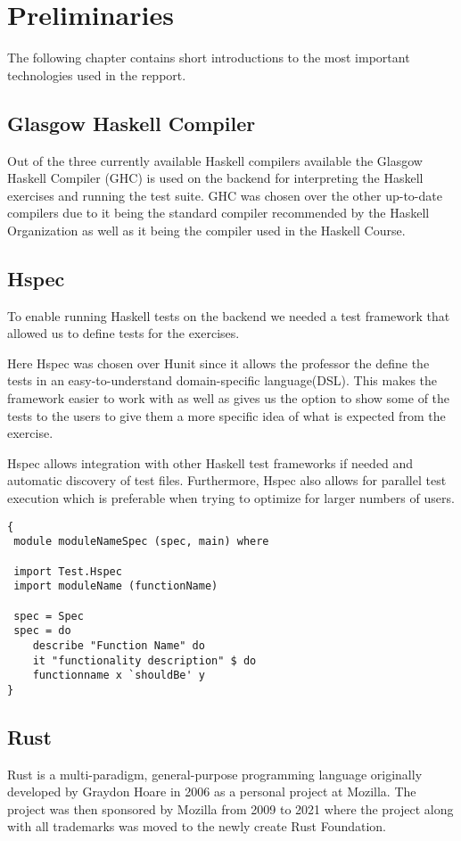 \chapter{Preliminaries}
The following chapter contains short introductions to the most important technologies used in the repport. 

\section{Glasgow Haskell Compiler} %
Out of the three currently available Haskell compilers available the Glasgow Haskell Compiler (GHC) is used on the backend for interpreting the Haskell exercises and running the test suite. GHC was chosen over the other up-to-date compilers due to it being the standard compiler recommended by the Haskell Organization \cite{Haskell_GHC} as well as it being the compiler used in the Haskell Course.

\section{Hspec}
To enable running Haskell tests on the backend we needed a test framework that allowed us to define tests for the exercises. 

Here Hspec was chosen over Hunit since it allows the professor the define the tests in an easy-to-understand domain-specific language(DSL). 
This makes the framework easier to work with as well as gives us the option to show some of the tests to the users to give them a more specific idea of what is expected from the exercise.

Hspec allows integration with other Haskell test frameworks if needed and automatic discovery of test files. 
Furthermore, Hspec also allows for parallel test execution which is preferable when trying to optimize for larger numbers of users.

\begin{lstlisting}[language=CSharp, caption={An example of a Hspec Test.}, label={lst:HspecTestExample}]
{
 module moduleNameSpec (spec, main) where

 import Test.Hspec
 import moduleName (functionName)
 
 spec = Spec
 spec = do
 	describe "Function Name" do
 	it "functionality description" $ do
	functionname x `shouldBe' y
}
\end{lstlisting}

\section{Rust}
Rust is a multi-paradigm, general-purpose programming language originally developed by Graydon Hoare in 2006 as a personal project at Mozilla. 
The project was then sponsored by Mozilla from 2009 to 2021 where the project along with all trademarks was moved to the newly create Rust Foundation. 

